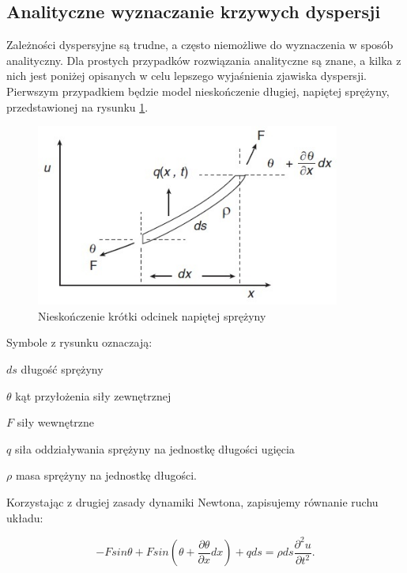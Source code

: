 
\subsection{Analityczne wyznaczanie krzywych dyspersji}

Zależności dyspersyjne są trudne, a często niemożliwe do wyznaczenia w sposób analityczny. Dla prostych przypadków rozwiązania analityczne są znane, a kilka z nich jest poniżej opisanych w celu lepszego wyjaśnienia zjawiska dyspersji.
Pierwszym przypadkiem będzie model nieskończenie długiej, napiętej sprężyny, przedstawionej na rysunku \ref{fig:nieskonczenie_krotki_odcinek_sprezyny}.

\begin{figure}[h]
\centering
\includegraphics[width=10cm]{Zdjecia/2/dyspersja_analitycznie_sprezyna}
\caption{Nieskończenie krótki odcinek napiętej sprężyny \cite{bartek_rose}}
\label{fig:nieskonczenie_krotki_odcinek_sprezyny}
\end{figure}

Symbole z rysunku oznaczają:

\begin{eqwhere}[2cm]
        \item[$ds$] długość sprężyny
        \item[$\theta$] kąt przyłożenia siły zewnętrznej
        \item[$F$] siły wewnętrzne
        \item[$q$] siła oddziaływania sprężyny na jednostkę długości ugięcia
        \item[$\rho$] masa sprężyny na jednostkę długości.
\end{eqwhere}

Korzystając z drugiej zasady dynamiki Newtona, zapisujemy równanie ruchu układu:

\begin{equation}
-Fsin\theta+Fsin(\theta+\frac{\partial \theta}{\partial x}dx)+qds = \rho ds \frac{\partial^2u}{\partial t^2}.
\end{equation}

